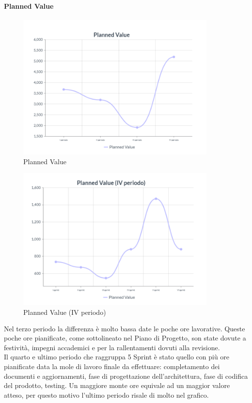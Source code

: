 \paragraph{Planned Value}
\begin{center}
\begin{figure}[H]
  \centering
  \renewcommand{\thefigure}{1}
  \includegraphics[width=10cm]{./res/images/PVGraph.png}
  \caption{Planned Value}
  \label{fig:Grafico Planned Value}
\end{figure}
\end{center}

\begin{center}
\begin{figure}[H]
  \centering
  \renewcommand{\thefigure}{2}
  \includegraphics[width=10cm]{./res/images/PVGraphSprint.png}
  \caption{Planned Value (IV periodo)}
  \label{fig:Grafico Planned Value (IV periodo)}
\end{figure}
\end{center}
Nel terzo periodo la differenza è molto bassa date le poche ore lavorative. Queste poche ore pianificate, come sottolineato nel Piano di Progetto, son state dovute a festività, impegni accademici e per la rallentamenti dovuti alla revisione.\\ 
Il quarto e ultimo periodo che raggruppa 5 Sprint è stato quello con più ore pianificate data la mole di lavoro finale da effettuare: completamento dei documenti e aggiornamenti, fase di progettazione dell’architettura, fase di codifica del prodotto, testing. Un maggiore monte ore equivale ad un maggior valore atteso, per questo motivo l’ultimo periodo risale di molto nel grafico.
\\
